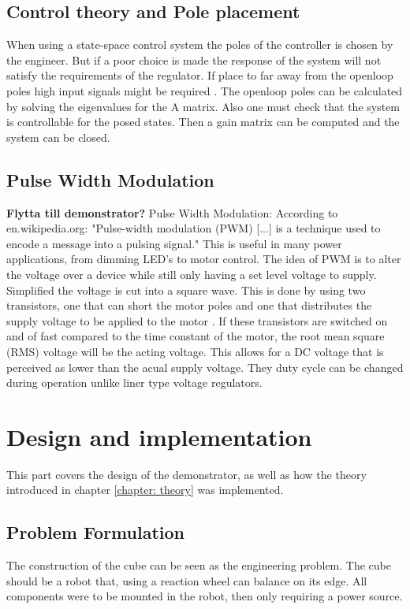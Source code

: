 \documentclass[a4paper,11pt]{kth-mag}
\begin{document}
\section{Control theory and Pole placement}
When using a state-space control system the poles of the controller is chosen by the engineer. But if a poor choice
is made the response of the system will not satisfy the requirements of the regulator. If place to far away from the 
openloop poles high input signals might be required \cite{regler}. The openloop poles can be calculated by solving the eigenvalues 
for the A matrix. Also one must check that the system is controllable for the posed states. Then a gain matrix can 
be computed and the system can be closed.



\section{Pulse Width Modulation}

\textbf{Flytta till demonstrator?}
Pulse Width Modulation:
According to en.wikipedia.org: "Pulse-width modulation (PWM) [...] is a technique used to encode a message into a 
pulsing signal."
This is useful in many power applications, from dimming LED's to motor control. The idea of 
PWM is to alter the voltage over a device while still only having a set level voltage to supply. Simplified  
the voltage is cut into a square wave. This is done by using two transistors, one that can short the motor poles and one that distributes the supply voltage to be applied to the motor \cite{elektro}. If these transistors are switched on and of fast 
compared to the time constant of the motor, the root mean square (RMS) voltage will be the acting voltage.
This allows for a DC voltage that is perceived as lower than the acual supply voltage.
They duty cycle can be changed during operation unlike liner type voltage regulators. 

 
\chapter{Design and implementation} \label{chapter: demonstrator}
This part covers the design of the demonstrator, as well as how the theory introduced in chapter \ref{chapter: theory} was implemented.

\section{Problem Formulation}
The construction of the cube can be seen as the engineering problem. The cube should be a robot that,
using a reaction wheel can balance on its edge. All components were to be mounted in the robot, then only 
requiring a power source. 
\end{document}
